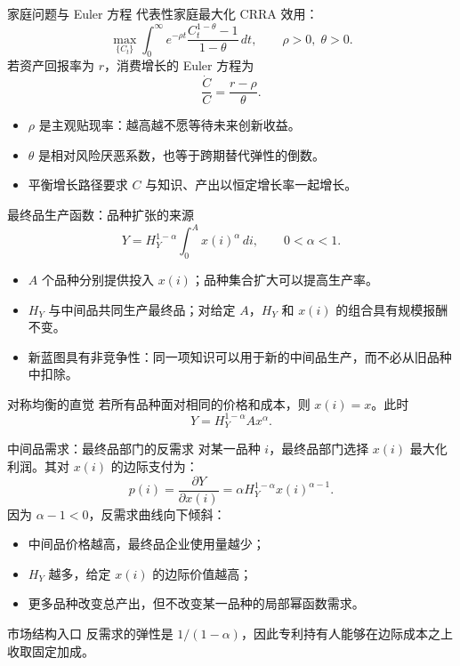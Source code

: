 \documentclass[aspectratio=32]{beamer}
\begin{document}
\begin{frame}{家庭问题与 Euler 方程}
\small
代表性家庭最大化 CRRA 效用：
\[
  \max_{\{C_t\}}\int_0^\infty e^{-\rho t}\frac{C_t^{1-\theta}-1}{1-\theta}\,dt,
  \qquad \rho>0,\;\theta>0.
\]
若资产回报率为 $r$，消费增长的 Euler 方程为
\[
  \boxed{\frac{\dot C}{C}=\frac{r-\rho}{\theta}}.
\]
\begin{itemize}
  \item $\rho$ 是主观贴现率：越高越不愿等待未来创新收益。
  \item $\theta$ 是相对风险厌恶系数，也等于跨期替代弹性的倒数。
  \item 平衡增长路径要求 $C$ 与知识、产出以恒定增长率一起增长。
\end{itemize}
\end{frame}

\begin{frame}{最终品生产函数：品种扩张的来源}
\small
\[
  \boxed{Y=H_Y^{1-\alpha}\int_0^A x(i)^\alpha\,di},
  \qquad 0<\alpha<1.
\]
\begin{itemize}
  \item $A$ 个品种分别提供投入 $x(i)$；品种集合扩大可以提高生产率。
  \item $H_Y$ 与中间品共同生产最终品；对给定 $A$，$H_Y$ 和 $x(i)$ 的组合具有规模报酬不变。
  \item 新蓝图具有非竞争性：同一项知识可以用于新的中间品生产，而不必从旧品种中扣除。
\end{itemize}
\begin{block}{对称均衡的直觉}
若所有品种面对相同的价格和成本，则 $x(i)=x$。此时
\[
  Y=H_Y^{1-\alpha}A x^\alpha.
\]
\end{block}
\end{frame}

\begin{frame}{中间品需求：最终品部门的反需求}
\small
对某一品种 $i$，最终品部门选择 $x(i)$ 最大化利润。其对 $x(i)$ 的边际支付为：
\[
  p(i)=\frac{\partial Y}{\partial x(i)}
  =\alpha H_Y^{1-\alpha}x(i)^{\alpha-1}.
\]
因为 $\alpha-1<0$，反需求曲线向下倾斜：
\begin{itemize}
  \item 中间品价格越高，最终品企业使用量越少；
  \item $H_Y$ 越多，给定 $x(i)$ 的边际价值越高；
  \item 更多品种改变总产出，但不改变某一品种的局部幂函数需求。
\end{itemize}
\begin{alertblock}{市场结构入口}
反需求的弹性是 $1/(1-\alpha)$，因此专利持有人能够在边际成本之上收取固定加成。
\end{alertblock}
\end{frame}
\end{document}
